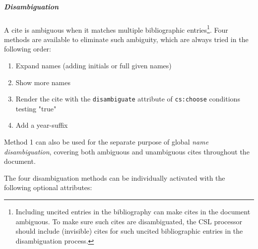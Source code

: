 \hypertarget{disambiguation}{%
\subparagraph{Disambiguation}\label{disambiguation}}

A cite is ambiguous when it matches multiple bibliographic
entries\footnote{Including uncited entries in the bibliography can make
  cites in the document ambiguous. To make sure such cites are
  disambiguated, the CSL processor should include (invisible) cites for
  such uncited bibliographic entries in the disambiguation process.}.
Four methods are available to eliminate such ambiguity, which are always
tried in the following order:

\begin{enumerate}
\def\labelenumi{\arabic{enumi}.}
\tightlist
\item
  Expand names (adding initials or full given names)
\item
  Show more names
\item
  Render the cite with the \texttt{disambiguate} attribute of
  \texttt{cs:choose} conditions testing "true"
\item
  Add a year-suffix
\end{enumerate}

Method 1 can also be used for the separate purpose of global \emph{name
disambiguation}, covering both ambiguous and unambiguous cites
throughout the document.

The four disambiguation methods can be individually activated with the
following optional attributes:

